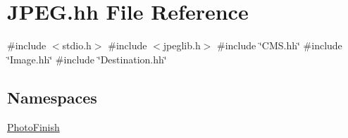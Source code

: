 \hypertarget{_j_p_e_g_8hh}{}\section{J\+P\+E\+G.\+hh File Reference}
\label{_j_p_e_g_8hh}
{\ttfamily \#include $<$stdio.\+h$>$}\newline
{\ttfamily \#include $<$jpeglib.\+h$>$}\newline
{\ttfamily \#include \char`\"{}C\+M\+S.\+hh\char`\"{}}\newline
{\ttfamily \#include \char`\"{}Image.\+hh\char`\"{}}\newline
{\ttfamily \#include \char`\"{}Destination.\+hh\char`\"{}}\newline
\subsection*{Namespaces}
\begin{DoxyCompactItemize}
\item 
 \hyperlink{namespace_photo_finish}{Photo\+Finish}
\end{DoxyCompactItemize}
